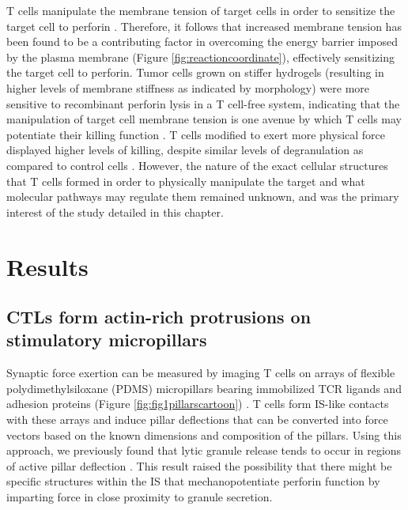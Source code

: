 T cells manipulate the membrane tension of target cells in order to sensitize the target cell to perforin \cite{Basu2016}. Therefore, it follows that increased membrane tension has been found to be a contributing factor in overcoming the energy barrier imposed by the plasma membrane (Figure \ref{fig:reactioncoordinate}), effectively sensitizing the target cell to perforin. Tumor cells grown on stiffer hydrogels (resulting in higher levels of membrane stiffness as indicated by morphology) were more sensitive to recombinant perforin lysis in a T cell-free system, indicating that the manipulation of target cell membrane tension is one avenue by which T cells may potentiate their killing function \cite{Basu2016}. T cells modified to exert more physical force displayed higher levels of killing, despite similar levels of degranulation as compared to control cells \cite{Basu2016}. However, the nature of the exact cellular structures that T cells formed in order to physically manipulate the target and what molecular pathways may regulate them remained unknown, and was the primary interest of the study detailed in this chapter.


\section{Results} 

\subsection{CTLs form actin-rich protrusions on stimulatory micropillars}
Synaptic force exertion can be measured by imaging T cells on arrays of flexible polydimethylsiloxane (PDMS) micropillars bearing immobilized TCR ligands and adhesion proteins (Figure \ref{fig:fig1pillarscartoon}) \cite{Bashour2014, Basu2016}. T cells form IS-like contacts with these arrays and induce pillar deflections that can be converted into force vectors based on the known dimensions and composition of the pillars. Using this approach, we previously found that lytic granule release tends to occur in regions of active pillar deflection \cite{Basu2016}. This result raised the possibility that there might be specific structures within the IS that mechanopotentiate perforin function by imparting force in close proximity to granule secretion.

